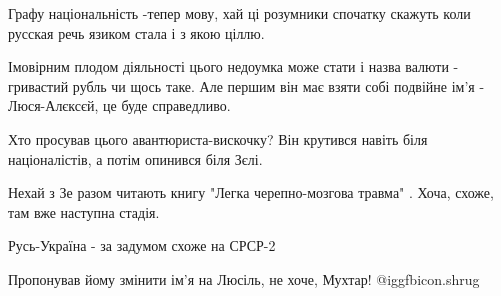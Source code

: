\begin{itemize}
 
Графу національність -тепер мову, хай ці розумники спочатку скажуть коли русская речь язиком стала і з якою ціллю.

 

Імовірним плодом діяльності цього недоумка може стати і назва валюти -
гривастий рубль чи щось таке. Але першим він має взяти собі подвійне ім'я -
Люся-Алєксєй, це буде справедливо.


 
Хто просував цього авантюриста-вискочку? Він крутився навіть біля націоналістів, а потім опинився біля Зєлі.

 
Нехай з Зе разом читають книгу "Легка черепно-мозгова травма" . Хоча, схоже, там вже наступна стадія.

 
Русь-Україна - за задумом схоже на СРСР-2

 
Пропонував йому змінити ім’я на Люсіль, не хоче, Мухтар!  @igg{fbicon.shrug} 


\end{itemize}
